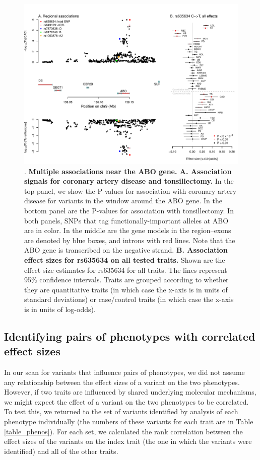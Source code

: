 \documentclass[11pt,titlepage]{article}
\begin{document}
\begin{figure}
\begin{center}
\includegraphics[scale = 0.7]{figs/CAD_TS_ABOregion.pdf}
\caption{. \textbf{Multiple associations near the ABO gene. A. Association signals for coronary artery disease and tonsillectomy.} In the top panel, we show the P-values for association with coronary artery disease for variants in the window around the ABO gene. In the bottom panel are the P-values for association with tonsillectomy. In both panels, SNPs that tag functionally-important alleles at ABO are in color. In the middle are the gene models in the region--exons are denoted by blue boxes, and introns with red lines. Note that the ABO gene is transcribed on the negative strand. \textbf{B. Association effect sizes for rs635634 on all tested traits.} Shown are the effect size estimates for rs635634 for all traits. The lines represent 95\% confidence intervals. Traits are grouped according to whether they are quantitative traits (in which case the x-axis is in units of standard deviations) or case/control traits (in which case the x-axis is in units of log-odds). }\label{f_eg}
\end{center}
\end{figure}

\subsection{Identifying pairs of phenotypes with correlated effect sizes}
In our scan for variants that influence pairs of phenotypes, we did not assume any relationship between the effect sizes of a variant on the two phenotypes. 
However, if two traits are influenced by shared underlying molecular mechanisms, we might expect the effect of a variant on the two phenotypes to be correlated. 
To test this, we returned to the set of variants identified by analysis of each phenotype individually (the numbers of these variants for each trait are in Table \ref{table_phenos}).
For each set, we calculated the rank correlation between the effect sizes of the variants on the index trait (the one in which the variants were identified) and all of the other traits. 
\end{document}
